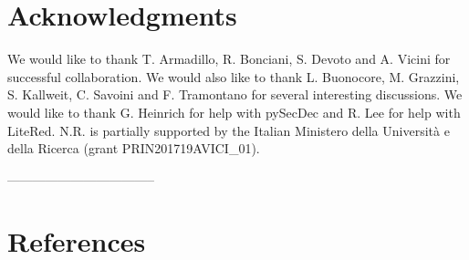 \documentclass[a4paper]{jpconf}
\begin{document}
\section*{Acknowledgments}
We would like to thank T. Armadillo, R. Bonciani, S. Devoto and A. Vicini for successful collaboration. 
We would also like to thank L. Buonocore, M. Grazzini, S. Kallweit, C. Savoini and F. Tramontano for several interesting discussions.
We would like to thank G. Heinrich for help with {\sc pySecDec} and R. Lee for help with {\sc LiteRed}.
% 
N.R. is partially supported by the Italian Ministero della Universit\`a e della Ricerca (grant PRIN201719AVICI\_01).


-----------------------------------

% 


\section*{References}

% 
% 


\end{document}
